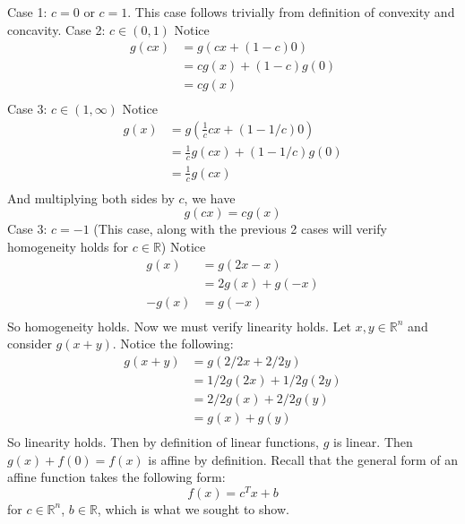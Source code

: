 \documentclass{article}
\begin{document}
Case 1: $c = 0$ or $c = 1$. This case follows trivially from definition of convexity and concavity.
\newline\newline
Case 2: $c \in (0,1)$
\newline
Notice
\begin{align*}
    g(cx) &= g(cx + (1-c)0) \\
    &= cg(x) + (1-c)g(0) \\
    &= cg(x) \\
\end{align*}
\newline\newline
Case 3: $c \in (1, \infty)$
\newline
Notice 
\begin{align*}
    g(x) &= g\left(\frac{1}{c}cx + (1 - 1/c)0\right) \\
    &= \frac{1}{c}g(cx) + (1 - 1/c)g(0) \\
    &= \frac{1}{c}g(cx) \\
\end{align*}
And multiplying both sides by $c$, we have
\[g(cx) = cg(x)\]
\newline\newline
Case 3: $c = -1$ (This case, along with the previous 2 cases will verify homogeneity holds for $c \in \mathbb{R}$)
\newline
Notice
\begin{align*}
    g(x) &= g(2x - x) \\
    &= 2g(x) + g(-x) \\
    -g(x) &= g(-x) \\
\end{align*}
So homogeneity holds. Now we must verify linearity holds. Let $x, y \in \mathbb{R}^n$ and consider $g(x+y)$. Notice the following:
\begin{align*}
    g(x+ y) &= g(2/2x + 2/2y) \\
    &= 1/2g(2x) + 1/2g(2y) \\
    &= 2/2g(x) + 2/2g(y) \\
    &= g(x) + g(y) \\
\end{align*}
So linearity holds. Then by definition of linear functions, $g$ is linear. Then $g(x) + f(0) = f(x)$ is affine by definition. Recall that the general form of an affine function takes the following form:
\[f(x) = c^Tx + b\]
for $c \in \mathbb{R}^n$, $b\in \mathbb{R}$, which is what we sought to show.
\end{document}
